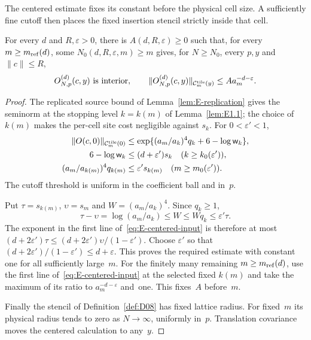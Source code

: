 

The centered estimate fixes its constant before the physical cell size. A sufficiently fine cutoff then places the fixed insertion stencil strictly inside that cell.
\begin{lemma}\label{lem:E2.3}
For every $d$ and $R,\varepsilon>0$, there is $A(d,R,\varepsilon)\ge0$ such that, for every $m\ge m_{\mathrm{ref}}(d)$, some $N_0(d,R,\varepsilon,m)\ge m$ gives, for $N\ge N_0$, every $p,y$ and $\|c\|\le R$,
\begin{equation*}
O_{N,p}^{(d)}(c,y)\text{ is interior},\qquad
\|O_{N,p}^{(d)}(c,y)\|_{\mathcal C^{\rm tile}_m(y)}\le Aa_m^{-d-\varepsilon}.
\end{equation*}
\end{lemma}
\begin{proof}
The replicated source bound of Lemma~\ref{lem:E-replication} gives the seminorm at the stopping level $k=k(m)$ of Lemma~\ref{lem:E1.1}; the choice of $k(m)$ makes the per-cell site cost negligible against $s_k$. For $0<\varepsilon'<1$,
\begin{align}\label{eq:E-centered-input}
 \|O(c,0)\|_{\mathcal C^{\rm tile}_m(0)}
 &\le\exp\{(a_m/a_k)^4q_k+6-\log\mathsf w_k\},\notag\\
 6-\log\mathsf w_k&\le(d+\varepsilon')s_k\quad(k\ge k_0(\varepsilon')),\notag\\
 (a_m/a_{k(m)})^4q_{k(m)}&\le\varepsilon' s_{k(m)}\quad(m\ge m_0(\varepsilon')).
\end{align}
The cutoff threshold is uniform in the coefficient ball and in~$p$.

Put $\tau=s_{k(m)}$, $\upsilon=s_m$ and $W=(a_m/a_k)^4$. Since $q_k\ge1$,
\begin{equation*}
\tau-\upsilon=\log(a_m/a_k)\le W\le Wq_k\le\varepsilon'\tau.
\end{equation*}
The exponent in the first line of~\eqref{eq:E-centered-input} is therefore at most $(d+2\varepsilon')\tau\le(d+2\varepsilon')\upsilon/(1-\varepsilon')$. Choose $\varepsilon'$ so that $(d+2\varepsilon')/(1-\varepsilon')\le d+\varepsilon$. This proves the required estimate with constant one for all sufficiently large~$m$. For the finitely many remaining $m\ge m_{\mathrm{ref}}(d)$, use the first line of~\eqref{eq:E-centered-input} at the selected fixed $k(m)$ and take the maximum of its ratio to $a_m^{-d-\varepsilon}$ and~one. This fixes~$A$ before~$m$.

Finally the stencil of Definition~\ref{def:D08} has fixed lattice radius. For fixed~$m$ its physical radius tends to zero as $N\to\infty$, uniformly in~$p$. Translation covariance moves the centered calculation to any~$y$.
\end{proof}

